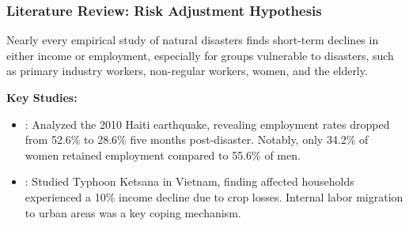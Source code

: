 \documentclass[serif, aspectratio=169]{beamer}
\newcommand{\returnbutton}[2]{%
  \vspace{-1.0cm}  %
  \hfill  %
  \hyperlink{#1}{%
    {\footnotesize\beamerbutton{#2}}%
  }%
  \vspace{0.3cm}  %
}
\begin{document}

\begin{frame}[label=risk_adjustment_hypothesis]
\frametitle{Literature Review: Risk Adjustment Hypothesis}

\vspace{-1.0cm} 
\returnbutton{literature_review2}{Return}


    Nearly every empirical study of natural disasters finds short-term declines in either income or employment, especially for groups vulnerable to disasters, such as primary industry workers, non-regular workers, women, and the elderly.
    
    \vspace{0.3cm}
    
    \textbf{Key Studies:}
    \begin{itemize}
        \item \citet{Kim2014ARetention}: Analyzed the 2010 Haiti earthquake, revealing employment rates dropped from 52.6\% to 28.6\% five months post-disaster. Notably, only 34.2\% of women retained employment compared to 55.6\% of men.
        \item \citet{Groger2016InternalTyphoon}: Studied Typhoon Ketsana in Vietnam, finding affected households experienced a 10\% income decline due to crop losses. Internal labor migration to urban areas was a key coping mechanism.
    \end{itemize}
    
\end{frame}

\end{document}
